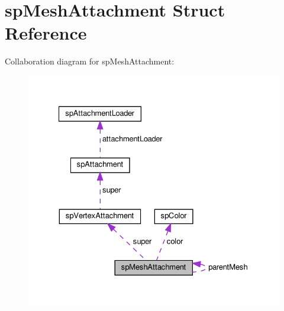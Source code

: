 \hypertarget{structspMeshAttachment}{}\section{sp\+Mesh\+Attachment Struct Reference}
\label{structspMeshAttachment}


Collaboration diagram for sp\+Mesh\+Attachment\+:
\nopagebreak
\begin{figure}[H]
\begin{center}
\leavevmode
\includegraphics[width=327pt]{structspMeshAttachment__coll__graph}
\end{center}
\end{figure}
